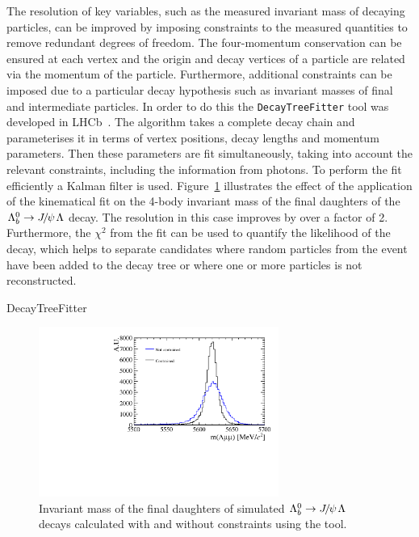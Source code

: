The resolution of key variables, such as the measured invariant mass of decaying particles,
can be improved by imposing constraints to the measured quantities to remove redundant degrees of freedom.
The four-momentum conservation can be ensured at each vertex and the origin and decay vertices of a particle are related via the momentum of the particle. Furthermore, additional constraints can be imposed due to a particular
decay hypothesis such as invariant masses of final and intermediate particles.
In order to do this the \verb!DecayTreeFitter! tool was developed in LHCb~\cite{Hulsbergen:2005pu}. The algorithm takes a complete decay chain and  parameterises it in terms of vertex positions, decay lengths and momentum parameters.
Then these parameters are fit simultaneously, taking into account the relevant constraints, including the information
from photons. To perform the fit efficiently a Kalman filter is used. Figure~\ref{fig:DTFeffect} illustrates the effect of
the application of the kinematical fit on the 4-body invariant mass of the final daughters of the $\Lb\to\jpsi\Lz$ decay.
The resolution in this case improves by over a factor of 2. Furthermore, the $\chi^2$ from the fit
can be used to quantify the likelihood of the decay, which helps to separate candidates where random particles
from the event have been added to the decay tree or where one or more particles is not reconstructed.
%
\begin{verbbox}DecayTreeFitter \end{verbbox}
\begin{figure}[h!]
\centering 
\includegraphics[width=0.7\textwidth]{Detector/figs/DTF_performance.pdf}
\caption{Invariant mass of the final daughters of simulated $\Lb\to\jpsi\Lz$ decays calculated
with and without constraints using the \theverbbox  tool. }
\label{fig:DTFeffect}
\end{figure}

